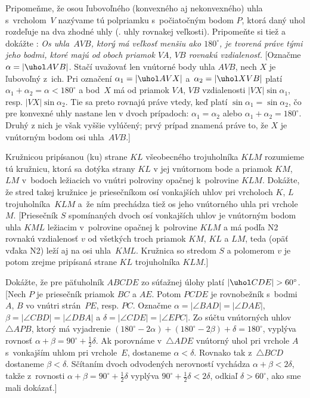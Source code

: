 {Pripomeňme, že osou ľubovoľného (konvexného aj nekonvexného) uhla
s~vrcholom~$V$ nazývame tú polpriamku s~počiatočným bodom $P$,
ktorá daný uhol rozdeľuje na dva zhodné uhly (\tj. uhly rovnakej
veľkosti). Pripomeňte si tiež a dokážte :
{\sl\it Os uhla~$AVB$, ktorý má veľkosť menšiu ako $180^{\circ}$,
je tvorená práve tými jeho bodmi, ktoré majú od oboch priamok $VA$, $VB$
rovnakú vzdialenosť.}
[Označme $\alpha=|\uhol AVB|$. Stačí uvažovať len vnútorné
body uhla $AVB$, nech $X$ je ľubovoľný z~ich. Pri označení
$\alpha_1=|\uhol AVX|$ a~$\alpha_2=|\uhol XVB|$ platí
$\alpha_1+\alpha_2=\alpha<180^{\circ}$ a bod~$X$ má od priamok
$VA$, $VB$ vzdialenosti $|VX|\sin\alpha_1$, resp. $|VX|\sin\alpha_2$.
Tie sa preto rovnajú práve vtedy, keď platí $\sin\alpha_1=\sin\alpha_2$, čo pre
konvexné uhly nastane len v dvoch prípadoch: $\alpha_1=\alpha_2$ alebo
$\alpha_1+\alpha_2=180^{\circ}$. Druhý z nich je však vyššie vylúčený;
prvý prípad znamená práve to, že $X$ je vnútorným bodom
osi uhla~$AVB$.]

Kružnicou pripísanou (ku) strane $KL$ všeobecného trojuholníka $KLM$ rozumieme tú
kružnicu, ktorá sa dotýka strany $KL$ v jej vnútornom bode
a priamok $KM$, $LM$ v~bodoch ležiacich vo vnútri polroviny
opačnej k~polrovine $KLM$.
Dokážte, že stred takej kružnice je priesečníkom osí vonkajších
uhlov pri vrcholoch $K$, $L$ trojuholníka~$KLM$ a~že ním prechádza tiež
os jeho vnútorného uhla pri vrchole~$M$.
[Priesečník $S$ spomínaných dvoch osí vonkajších uhlov je vnútorným bodom
uhla $KML$ ležiacim v~polrovine opačnej k~polrovine $KLM$ a
má podľa N2 rovnakú vzdialenosť $v$ od všetkých troch priamok $KM$, $KL$
a $LM$, teda (opäť vďaka N2) leží aj na osi uhla~$KML$.
Kružnica so stredom $S$ a polomerom $v$ je potom zrejme pripísaná
strane $KL$ trojuholníka $KLM$.]

\D
Dokážte, že pre päťuholník $ABCDE$ zo súťažnej úlohy
platí $|\uhol CDE|>60^{\circ}$.
[Nech $P$ je priesečník priamok $BC$ a $AE$. Potom $PCDE$ je
rovnobežník s~bodmi $A$, $B$ vo vnútri strán~$PE$, resp. $PC$.
Označme $\alpha=|\angle BAD|=|\angle DAE|$, $\beta=|\angle CBD|=|\angle DBA|$
a $\delta=|\angle CDE|=|\angle EPC|$. Zo súčtu vnútorných uhlov
$\triangle APB$, ktorý má vyjadrenie
${(180^{\circ}-2\alpha)}+{(180^{\circ}-2\beta)}+\delta=180^{\circ}$,
vyplýva rovnosť $\alpha+\beta=90^{\circ}+\frac12\delta$. Ak porovnáme
v~$\triangle ADE$ vnútorný uhol pri vrchole $A$ s~vonkajším uhlom pri
vrchole~$E$, dostaneme $\alpha<\delta$. Rovnako tak z~$\triangle BCD$
dostaneme $\beta<\delta$. Sčítaním dvoch odvodených nerovností
vychádza $\alpha+\beta<2\delta$, takže z~rovnosti $\alpha+\beta=90^{\circ}+\frac12\delta$
vyplýva $90^{\circ}+\frac12\delta<2\delta$, odkiaľ $\delta>60^{\circ}$, ako
sme mali dokázať.]

}
